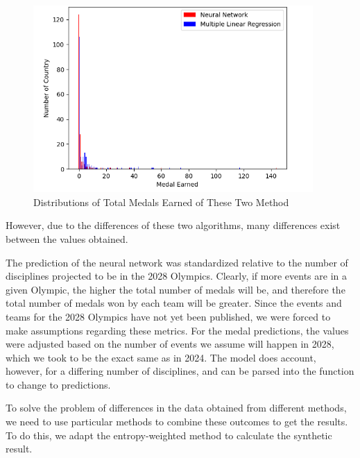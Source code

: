 \documentclass{mcmthesis}
\begin{document}
\begin{figure}[H]
  \centering
  \includegraphics[width=0.95\textwidth]{myplot} %
  \caption{Distributions of Total Medals Earned of These Two Method }
  \label{exampleId}
\end{figure}
However, due to the differences of these two algorithms, many differences exist between the values obtained.

The prediction of the neural network was standardized relative to the number of disciplines projected to be in the 2028 Olympics. Clearly, if more events are in a given Olympic, the higher the total number of medals will be, and therefore the total number of medals won by each team will be greater. Since the events and teams for the 2028 Olympics have not yet been published, we were forced to make assumptions regarding these metrics. For the medal predictions, the values were adjusted based on the number of events we assume will happen in 2028, which we took to be the exact same as in 2024. The model does account, however, for a differing number of disciplines, and can be parsed into the function to change to predictions.

To solve the problem of differences in the data obtained from different methods, we need to use particular methods to combine these outcomes to get the results. To do this, we adapt the entropy-weighted method to calculate the synthetic result.
\end{document}
